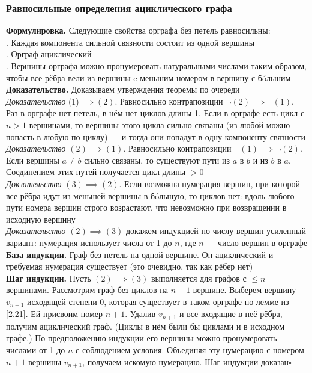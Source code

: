 \documentclass[a4paper]{article}
\newcommand{\qed}{\hfill$\square$}
\begin{document}
\subsubsection*{Равносильные определения ациклического графа}
\textbf{Формулировка.} Следующие свойства орграфа без петель равносильны:\\[2mm]
. Каждая компонента сильной связности состоит из одной вершины\\[2mm]
. Орграф ациклический\\[2mm]
. Вершины орграфа можно пронумеровать натуральными числами таким образом, чтобы все рёбра вели из вершины c меньшим номером в вершину с б\'oльшим\\[2mm]
\indent\textbf{Доказательство.} Доказываем утверждения теоремы по очереди\\[2mm]
\textit{Доказательство} (1)$\implies(2)$. Равносильно контрапозиции $\neg(2)\implies\neg(1)$. Раз в орграфе нет петель, в нём нет циклов длины 1. Если в орграфе есть цикл с $n > 1$ вершинами, то вершины этого цикла сильно связаны (из любой можно попасть в любую по циклу) — и тогда они попадут в одну компоненту связности\\[3mm]
\textit{Доказательство $(2)\implies(1)$}. Равносильно контрапозиции $\neg(1)\implies\neg(2)$. Если вершины $a\ne b$ сильно связаны, то существуют пути из $a$ в $b$ и из $b$ в $a$. Соединением этих путей получается цикл длины $> 0$\\[3mm]
\textit{Докзательство $(3)\implies(2)$}. Если возможна нумерация вершин, при которой все рёбра идут из меньшей вершины в б\'oльшую, то циклов нет: вдоль любого пути номера вершин строго возрастают, что невозможно при возвращении в исходную вершину\\[3mm]
\textit{Доказательство $(2)\implies(3)$ }докажем индукцией по числу вершин усиленный вариант: нумерация использует числа от 1 до $n$, где $n$ — число вершин в орграфе\\[2mm]
\indent\textbf{База индукции.} Граф без петель на одной вершине. Он ациклический и требуемая нумерация существует (это очевидно, так как рёбер нет)\\[2mm]
\indent\textbf{Шаг индукции.} Пусть $(2)\implies(3)$ выполняется для графов с $\leqslant n$ вершинами. Рассмотрим граф без циклов на $n+1$ вершине. Выберем вершину $v_{n+1}$ исходящей степени 0, которая существует в таком орграфе по лемме из \ref{2.21}. Ей присвоим номер $n + 1$. Удалив $v_{n+1}$ и все входящие в неё рёбра, получим ациклический граф. (Циклы в нём были бы циклами и в исходном графе.) По предположению индукции его вершины можно пронумеровать числами от 1 до $n$ с соблюдением условия. Объединяя эту нумерацию с номером $n + 1$ вершины $v_{n+1}$, получаем искомую нумерацию. Шаг индукции доказан\qed
\label{2.21}
\end{document}
